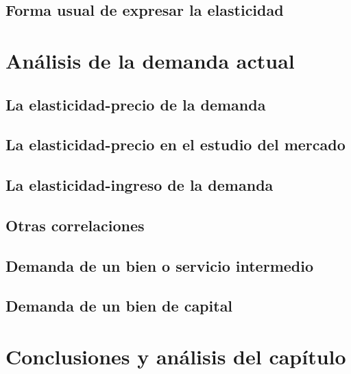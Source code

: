 \documentclass[crop=false]{standalone}
\begin{document}
\subsection{Forma usual de expresar la elasticidad}


\section{Análisis de la demanda actual}

\subsection{La elasticidad-precio de la demanda}

\subsection{ La elasticidad-precio en el estudio del mercado}

\subsection{La elasticidad-ingreso de la demanda}

\subsection{ Otras correlaciones}

\subsection{Demanda de un bien o servicio intermedio}

\subsection{Demanda de un bien de capital}

\section{ Conclusiones y análisis del capítulo }

\end{document}

